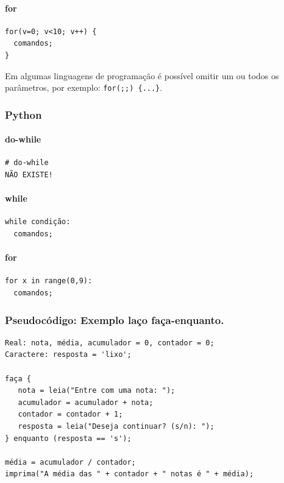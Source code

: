 \documentclass[12pt,a4paper]{article}
\begin{document}
    \hypertarget{for}{%
\paragraph{for}\label{for}}

    \begin{verbatim}
for(v=0; v<10; v++) {
  comandos;
}
\end{verbatim}

Em algumas linguagens de programação é possível omitir um ou todos os
parâmetros, por exemplo: \texttt{for(;;)\ \{...\}}.

    \hypertarget{python}{%
\subsubsection{Python}\label{python}}

    \hypertarget{do-while}{%
\paragraph{do-while}\label{do-while}}

    \begin{verbatim}
# do-while
NÃO EXISTE!
\end{verbatim}

    \hypertarget{while}{%
\paragraph{while}\label{while}}

    \begin{verbatim}
while condição:
  comandos;
\end{verbatim}

    \hypertarget{for}{%
\paragraph{for}\label{for}}

    \begin{verbatim}
for x in range(0,9):
  comandos;
\end{verbatim}

    \hypertarget{pseudocuxf3digo-exemplo-lauxe7o-fauxe7a-enquanto.}{%
\subsubsection{Pseudocódigo: Exemplo laço
faça-enquanto.}\label{pseudocuxf3digo-exemplo-lauxe7o-fauxe7a-enquanto.}}

\begin{verbatim}
Real: nota, média, acumulador = 0, contador = 0;
Caractere: resposta = 'lixo';

faça {
   nota = leia("Entre com uma nota: ");
   acumulador = acumulador + nota;
   contador = contador + 1;
   resposta = leia("Deseja continuar? (s/n): ");
} enquanto (resposta == 's');

média = acumulador / contador;
imprima("A média das " + contador + " notas é " + média);
\end{verbatim}
\end{document}
